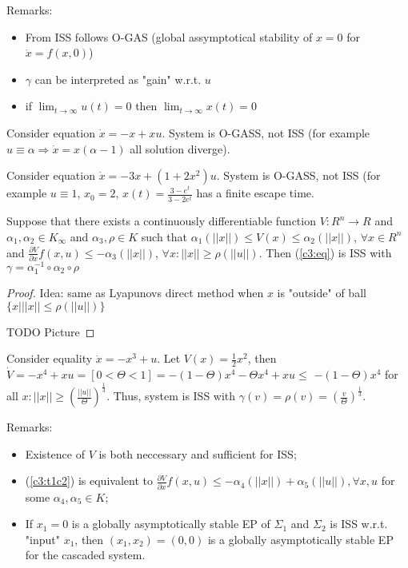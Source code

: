 Remarks:

\begin{itemize}
 \item From ISS follows O-GAS (global assymptotical stability of $x=0$ for
   $\dot x=f(x,0)$)
 \item $\gamma$ can be interpreted as "gain" w.r.t. $u$
 \item if $\lim_{t\to\infty} u(t)=0$ then $\lim_{t \to\infty}x(t)=0$
\end{itemize}

\begin{Example}
 Consider equation $\dot x = -x+xu$. System is O-GASS, not ISS (for example
 $u\equiv\alpha \Rightarrow \dot x = x (\alpha-1)$ all solution diverge).
\end{Example}

\begin{Example}
 Consider equation $\dot x =-3x+(1+2x^2)u$. System is O-GASS, not ISS (for example 
 $u\equiv1$, $x_0=2$, $x(t)=\frac{3-e^{t}}{3-2e^{t}}$ has a finite escape time.
\end{Example}

\begin{Theorem}
 Suppose that there exists a continuously differentiable function 
 $V:R^n\to R$ and $\alpha_1,\alpha_2\in K_\infty$ and $\alpha_3, \rho \in K$
 such that $\alpha_1(||x||)\le V(x)\le\alpha_2(||x||)$, $\forall x\in R^n$ and
 $\frac{\partial V}{\partial x}f(x,u)\le-\alpha_3(||x||)$,
 $\forall x: ||x||\ge\rho(||u||)$. Then (\ref{c3:eq}) is ISS with 
 $\gamma = \alpha_1^{-1} \circ \alpha_2\circ\rho$

 \begin{proof}
 Idea: same as Lyapunovs direct method when $x$ is "outside" of ball
 $\{x | ||x||\le\rho(||u||)\}$

 TODO Picture
 \end{proof}
\end{Theorem}


\begin{Example}
 Consider equality $\dot x = -x^3+u$. Let $V(x)=\frac{1}{2}x^2$, then
 $\dot V = -x^4+xu=[0<\Theta<1]=-(1-\Theta)x^4-\Theta x^4+xu\le$
 $-(1-\Theta)x^4$ for all $x: ||x||\ge\left(\frac{||u||}{\Theta}\right)^\frac{1}{3}$.
 Thus, system is ISS with 
 $\gamma(v)=\rho(v)=\left(\frac{v}{\Theta}\right)^\frac{1}{3}$.
\end{Example}


Remarks:
\begin{itemize}
 \item Existence of $V$ is both neccessary and sufficient for ISS;
 \item (\ref{c3:t1c2}) is equivalent to $\frac{\partial V}{\partial x}f(x,u) \le -\alpha_4(||x||)+\alpha_5(||u||), \forall x,u$ for some $\alpha_4,\alpha_5\in K$;
 \item %
  If $x_1=0$ is a globally asymptotically stable EP of $\Sigma_1$ and $\Sigma_2$ is ISS w.r.t. "input" $x_1$, then $(x_1,x_2)=(0,0)$ is a globally asymptotically stable EP for the cascaded system.
\end{itemize}

